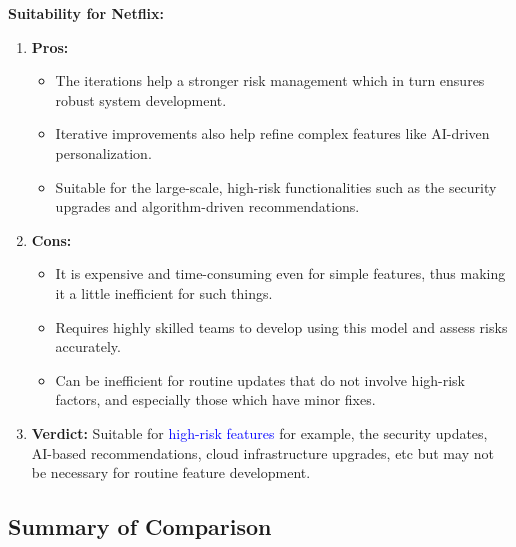 \documentclass[a4paper,10pt,twoside]{article}
\begin{document}
\textbf{Suitability for Netflix:}
\begin{enumerate}
    \item \textbf{Pros:}
    \begin{itemize}
        \item The iterations help a stronger risk management which in turn ensures robust system development.
        \item Iterative improvements also help refine complex features like AI-driven personalization.
        \item Suitable for the large-scale, high-risk functionalities such as the security upgrades and algorithm-driven recommendations.
    \end{itemize}
    \item \textbf{Cons:}
    \begin{itemize}
        \item It is expensive and time-consuming even for simple features, thus making it a little inefficient for such things.
        \item Requires highly skilled teams to develop using this model and assess risks accurately.
        \item Can be inefficient for routine updates that do not involve high-risk factors, and especially those which have minor fixes.
    \end{itemize}
    \item \textbf{Verdict:} Suitable for \textcolor{Blue}{high-risk features} for example, the security updates, AI-based recommendations, cloud infrastructure upgrades, etc but may not be necessary for routine feature development.
\end{enumerate}
\newpage
\subsection{Summary of Comparison}
\begin{table}[h]
    \centering
    \setlength{\tabcolsep}{10pt}
    \renewcommand{\arraystretch}{1.5}
    \caption{Comparison of SDLC Models for Netflix}
\end{table}
\end{document}
